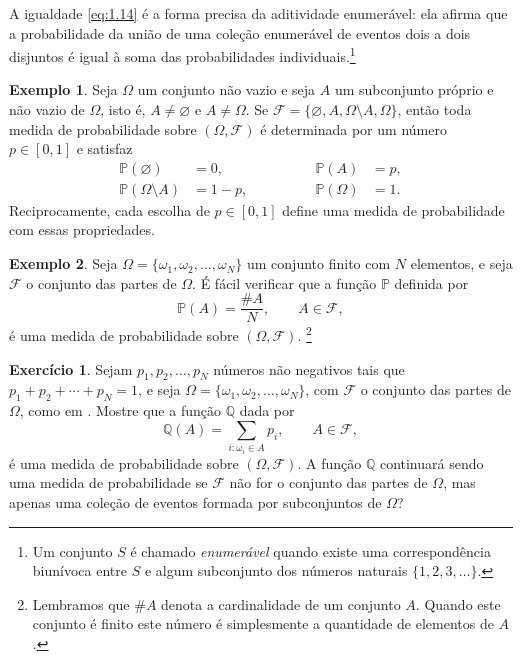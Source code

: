 \documentclass[12pt,portuguese]{article}
\theoremstyle{definition}
\newtheorem{example}[example]{Exemplo}
\newtheorem{exercise}{Exercício}
\begin{document}
A igualdade \eqref{eq:1.14} é a forma precisa da aditividade enumerável: ela
afirma que a probabilidade da união de uma coleção enumerável de eventos dois
a dois disjuntos é igual à soma das probabilidades individuais.\footnote{Um
conjunto \(S\) é chamado \emph{enumerável} quando existe uma correspondência
biunívoca entre \(S\) e algum subconjunto dos números naturais
\(\{1, 2, 3, \ldots\}\).}

\begin{example}\label{ex:1.15}
Seja \(\Omega\) um conjunto não vazio e seja \(A\) um subconjunto próprio e
não vazio de \(\Omega\), isto é, \(A \neq \varnothing\) e \(A \neq \Omega\).
Se \(\mathcal{F} = \{\varnothing, A, \Omega \setminus A, \Omega\}\), então
toda medida de probabilidade sobre \((\Omega, \mathcal{F})\) é determinada
por um número \(p \in [0,1]\) e satisfaz
\[
\begin{aligned}
\mathbb{P}(\varnothing) &= 0, &
\mathbb{P}(A) &= p, \\
\mathbb{P}(\Omega \setminus A) &= 1 - p,\qquad \qquad  &
\mathbb{P}(\Omega) &= 1.
\end{aligned}
\]
Reciprocamente, cada escolha de \(p \in [0,1]\) define uma medida de
probabilidade com essas propriedades.
\end{example}

\begin{example}\label{ex:1.16}
Seja \(\Omega = \{\omega_1, \omega_2, \ldots, \omega_N\}\) um conjunto
finito com \(N\) elementos, e seja \(\mathcal{F}\) o conjunto das partes de
\(\Omega\). É fácil verificar que a função \(\mathbb{P}\) definida por
\[
\mathbb{P}(A) = \frac{\# A}{N}, \qquad A \in \mathcal{F},
\]
é uma medida de probabilidade sobre \((\Omega, \mathcal{F})\).
\footnote{Lembramos que $\# A$ denota a cardinalidade de um conjunto \(A\). 
Quando este conjunto é finito este número é simplesmente a quantidade de elementos de \(A\).}
\end{example}

\begin{exercise}\label{exercise:1.17}
Sejam \(p_1, p_2, \ldots, p_N\) números não negativos tais que \(p_1 +
p_2 + \cdots + p_N = 1\), e seja \(\Omega = \{\omega_1, \omega_2, \ldots,
\omega_N\}\), com \(\mathcal{F}\) o conjunto das partes de \(\Omega\), como
em . Mostre que a função \(\mathbb{Q}\) dada por
\[
\mathbb{Q}(A) = \sum_{i: \omega_i \in A} p_i, \qquad A \in \mathcal{F},
\]
é uma medida de probabilidade sobre \((\Omega, \mathcal{F})\). A função
\(\mathbb{Q}\) continuará sendo uma medida de probabilidade se \(\mathcal{F}\)
não for o conjunto das partes de \(\Omega\), mas apenas uma coleção de
eventos formada por subconjuntos de \(\Omega\)?
\end{exercise}
\end{document}
